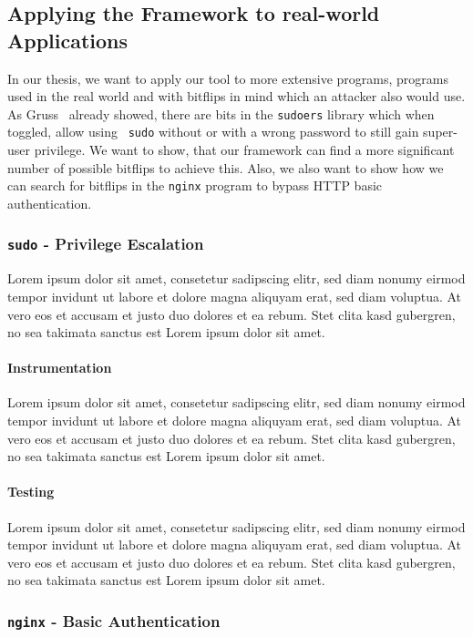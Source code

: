 \subsection{Applying the Framework to real-world Applications}

In our thesis, we want to apply our tool to more extensive programs, programs
used in the real world and with bitflips in mind which an attacker also would
use. As Gruss~\etal\cite{flipinthewall} already showed, there are bits in the
\texttt{sudoers} library which when toggled, allow using ~\texttt{sudo} without
or with a wrong password to still gain super-user privilege. We want to show,
that our framework can find a more significant number of possible bitflips to
achieve this. Also, we also want to show how we can search for bitflips in the
\texttt{nginx} program to bypass HTTP basic authentication.

\subsubsection{\texttt{sudo} - Privilege Escalation}

Lorem ipsum dolor sit amet, consetetur sadipscing elitr, sed diam nonumy eirmod
tempor invidunt ut labore et dolore magna aliquyam erat, sed diam voluptua. At
vero eos et accusam et justo duo dolores et ea rebum. Stet clita kasd gubergren,
no sea takimata sanctus est Lorem ipsum dolor sit amet.

\paragraph{Instrumentation} Lorem ipsum dolor sit amet, consetetur sadipscing
elitr, sed diam nonumy eirmod tempor invidunt ut labore et dolore magna
aliquyam erat, sed diam voluptua. At vero eos et accusam et justo duo dolores
et ea rebum. Stet clita kasd gubergren, no sea takimata sanctus est Lorem ipsum
dolor sit amet.

\paragraph{Testing} Lorem ipsum dolor sit amet, consetetur sadipscing
elitr, sed diam nonumy eirmod tempor invidunt ut labore et dolore magna
aliquyam erat, sed diam voluptua. At vero eos et accusam et justo duo dolores
et ea rebum. Stet clita kasd gubergren, no sea takimata sanctus est Lorem ipsum
dolor sit amet.

\subsubsection{\texttt{nginx} - Basic Authentication}

